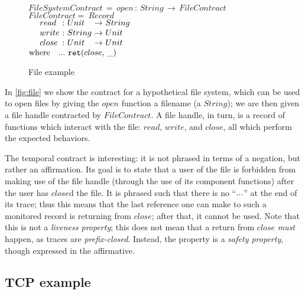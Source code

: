 \begin{figure}
 $FileSystemContract\, =\, open\, :\, String\, \to\, FileContract$ \\
 $FileContract =~ Record$ \\
 $\begin{array}{ @{\quad~}l@{\ :} @{~}l@{\ \to\ } l }
  read & Unit & String \\
  write & String & Unit \\
  close & Unit & Unit
 \end{array}$ \\
 $\text{where}\quad {\tt ...}~ {\tt ret}(close,\, \_)$
 \caption{File example}
 \label{fig:file}
\end{figure}
\FloatBarrier

In \autoref{fig:file} we show the contract for a hypothetical file system, which can be used to open files by giving the $open$ function a filename (a $String$); we are then given a file handle contracted by $FileContract$.
%
A file handle, in turn, is a record of functions which interact with the file: $read$, $write$, and $close$, all which perform the expected behaviors.

The temporal contract is interesting: it is not phrased in terms of a negation, but rather an affirmation.
%
Its goal is to state that a user of the file is forbidden from making use of the file handle (through the use of its component functions) after the user has $close$d the file.
%
It is phrased such that there is no ``${\tt ...}$'' at the end of its trace; thus this means that the last reference one can make to such a monitored record is returning from $close$; after that, it cannot be used.
%
Note that this is not a \emph{liveness property}; this does not mean that a return from $close$ \emph{must} happen, as traces are \emph{prefix-closed}.
%
Instead, the property is a \emph{safety property}, though expressed in the affirmative.

\subsection{TCP example}

